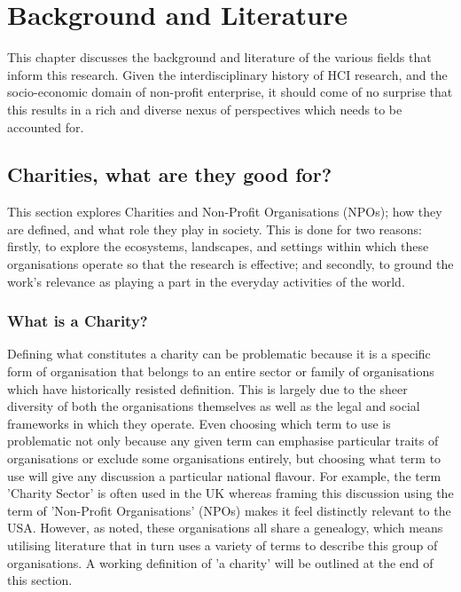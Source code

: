 \chapter{Background and Literature}
\label{sec:related}

This chapter discusses the background and literature of the various fields that inform this research. Given the interdisciplinary history of HCI research, and the socio-economic domain of non-profit enterprise, it should come of no surprise that this results in a rich and diverse nexus of perspectives which needs to be accounted for.

\section{Charities, what are they good for?}
This section explores Charities and Non-Profit Organisations (NPOs); how they are defined, and what role they play in society. This is done for two reasons: firstly, to explore the ecosystems, landscapes, and settings within which these organisations operate so that the research is effective; and secondly, to ground the work's relevance as playing a part in the everyday activities of the world.

\subsection{What is a Charity?}

Defining what constitutes a charity can be problematic because it is a specific form of organisation that belongs to an entire sector or family of organisations which have historically resisted definition. This is largely due to the sheer diversity of both the organisations themselves as well as the legal and social frameworks in which they operate. Even choosing which term to use is problematic not only because any given term can emphasise particular traits of organisations or exclude some organisations entirely, but choosing what term to use will give any discussion a particular national flavour. For example, the term 'Charity Sector' is often used in the UK whereas framing this discussion using the term of 'Non-Profit Organisations' (NPOs) makes it feel distinctly relevant to the USA. However, as noted, these organisations all share a genealogy, which means utilising literature that in turn uses a variety of terms to describe this group of organisations. A working definition of 'a charity' will be outlined at the end of this section.


